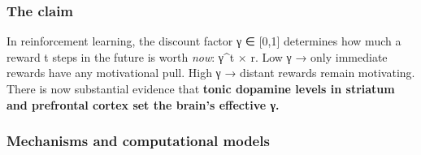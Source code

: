 \subsubsection{The claim}\label{01_dopamine_substrate-the-claim}

In reinforcement learning, the discount factor γ ∈ {[}0,1{]} determines how much a reward t steps in the future is worth \emph{now}: γ\^{}t × r. Low γ → only immediate rewards have any motivational pull. High γ → distant rewards remain motivating. There is now substantial evidence that \textbf{tonic dopamine levels in striatum and prefrontal cortex set the brain's effective γ.}

\subsubsection{Mechanisms and computational models}\label{01_dopamine_substrate-mechanisms-and-computational-models}

